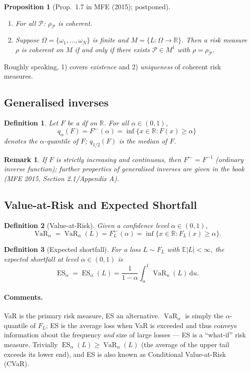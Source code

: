 \documentclass[11pt,a4paper]{article}
\newtheorem{proposition}{Proposition}
\newtheorem{definition}{Definition}
\newtheorem{remark}{Remark}
\newcommand{\VaR}{\operatorname{VaR}}
\newcommand{\ES}{\operatorname{ES}}
\newcommand{\real}{\mathbb{R}}
\newcommand{\E}{\mathbb{E}}
\newcommand{\dd}{\,\mathrm{d}}
\begin{document}
\begin{proposition}[Prop.\ 1.7 in MFE (2015); postponed]
\begin{enumerate}[label=\arabic*),leftmargin=*]
  \item For all $\mathcal{P}$: $\rho_{\mathcal{P}}$ is coherent.
  \item Suppose $\Omega=\{\omega_1,\dots,\omega_N\}$ is finite and $M=\{L:\Omega\to\real\}$. Then a
        risk measure $\rho$ is coherent on $M$ if and only if there exists
        $\mathcal{P}\in M^1$ with $\rho=\rho_{\mathcal{P}}$.
\end{enumerate}
\end{proposition}
Roughly speaking, 1) covers \emph{existence} and 2) \emph{uniqueness} of coherent risk measures.

\subsection{Generalised inverses}
\begin{definition}
Let $F$ be a df on $\real$. For all $\alpha\in(0,1)$,
\[
  q_\alpha(F)=F^{\leftarrow}(\alpha)=\inf\{x\in\real:F(x)\ge\alpha\}
\]
denotes the $\alpha$-\emph{quantile} of $F$; $q_{1/2}(F)$ is the median of $F$.
\end{definition}
\begin{remark}
If $F$ is strictly increasing and continuous, then $F^{\leftarrow}=F^{-1}$ (ordinary inverse
function); further properties of generalised inverses are given in the book (MFE 2015,
Section 2.1/Appendix A).
\end{remark}

\subsection{Value-at-Risk and Expected Shortfall}
\begin{definition}[Value-at-Risk]
Given a confidence level $\alpha\in(0,1)$,
\[
  \VaR_\alpha=\VaR_\alpha(L)=F_L^{\leftarrow}(\alpha)
   =\inf\{x\in\real:F_L(x)\ge\alpha\}.
\]
\end{definition}
\begin{definition}[Expected shortfall]
For a loss $L\sim F_L$ with $\E|L|<\infty$, the expected shortfall at level $\alpha\in(0,1)$ is
\[
  \ES_\alpha=\ES_\alpha(L)=\frac{1}{1-\alpha}\int_\alpha^1 \VaR_u(L)\dd u .
\]
\end{definition}

\paragraph{Comments.} VaR is the primary risk measure, ES an alternative. $\VaR_\alpha$ is simply the
$\alpha$-quantile of $F_L$; ES is the average loss when VaR is exceeded and thus conveys information
about the frequency \emph{and} size of large losses --- ES is a ``what-if'' risk measure.
Trivially $\ES_\alpha(L)\ge\VaR_\alpha(L)$ (the average of the upper tail exceeds its lower end), and
ES is also known as Conditional Value-at-Risk (CVaR).
\end{document}
